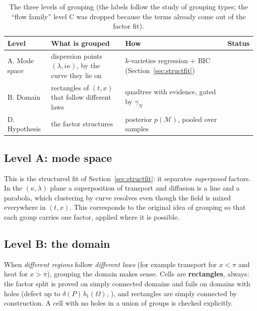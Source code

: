 \begin{table}[!htb]
\centering\small
\begin{tabular}{@{}L{2.5cm}L{4.1cm}L{4.5cm}L{2.2cm}@{}}
\toprule
Level & What is grouped & How & Status\\\midrule
A. Mode space & dispersion points $(\lambda,i\kappa)$, by the curve they lie on & $k$-varieties regression + BIC (Section~\ref{sec:structfit}) & \impl{}\\
B. Domain & rectangles of $(t,x)$ that follow different laws & quadtree with evidence, gated by $\gamma_N$ & \implu{}\\
D. Hypothesis & the factor structures & posterior $p(\mathcal M)$, pooled over samples & \impl{}\\
\bottomrule
\end{tabular}
\caption{The three levels of grouping (the labels follow the study of grouping types; the ``flow family'' level C was dropped because the terms already come out of the factor fit).}
\end{table}

\subsection{Level A: mode space}
This is the structured fit of Section~\ref{sec:structfit}: it separates \emph{superposed} factors. In the $(\kappa,\lambda)$ plane a superposition of transport and diffusion is a line and a parabola, which clustering by curve resolves even though the field is mixed everywhere in $(t,x)$. This corresponds to the original idea of grouping so that each group carries one factor, applied where it is possible.

\subsection{Level B: the domain}
When \emph{different regions} follow \emph{different laws} (for example transport for $x<\pi$ and heat for $x>\pi$), grouping the domain makes sense. Cells are \textbf{rectangles}, always: the factor split is proved on simply connected domains and fails on domains with holes (defect up to $\delta(P)\,b_1(\Omega)$, ), and rectangles are simply connected by construction. A cell with no holes in a union of groups is checked explicitly.

